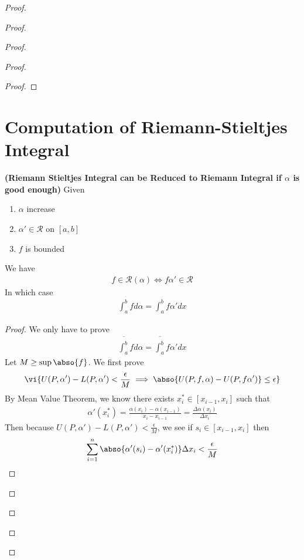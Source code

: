\documentclass{report}
\begin{document}
\begin{proof}
\begin{proof}
\begin{proof}
\begin{proof}
\begin{proof}
\end{proof}


\section{Computation of Riemann-Stieltjes Integral}
\begin{theorem}
\label{7.3.1}
\textbf{(Riemann Stieltjes Integral can be Reduced to Riemann Integral if $\alpha $ is good enough)} Given 
\begin{enumerate}[label=(\alph*)]
  \item $\alpha $ increase 
  \item $\alpha '\in \mathscr{R}$ on $[a,b]$ 
  \item $f$ is bounded
\end{enumerate}
We have 
\begin{align*}
 f\in \mathscr{R}(\alpha )\iff  f\alpha ' \in \mathscr{R}
\end{align*}
In which case 
\begin{align*}
\int_a^b fd\alpha =\int_a^b f \alpha ' dx
\end{align*}
\end{theorem}
\begin{proof}
We only have to prove 
\begin{align*}
\overline{\int_a^b} fd\alpha = \overline{\int_a^b}f\alpha ' dx 
\end{align*}
Let $M\geq \sup \abso{f}$. We first prove 
\begin{align*}
  \vi{U(P,\alpha ')-L(P,\alpha ')<\frac{\epsilon}{M}\implies \abso{U(P,f,\alpha )-U(P,f\alpha ')}\leq \epsilon }
\end{align*}
By Mean Value Theorem, we know there exists $x_i^* \in [x_{i-1},x_i]$ such that 
\begin{align*}
\alpha' (x_i^*)= \frac{\alpha (x_i)-\alpha (x_{i-1})}{x_i-x_{i-1}}=\frac{\Delta \alpha (x_i)}{\Delta x_i}
\end{align*}
Then because $U(P,\alpha ')-L(P,\alpha ')<\frac{\epsilon}{M}$, we see if $s_i \in [x_{i-1},x_i]$ then 
\begin{align*}
\sum_{i=1}^n \abso{\alpha '(s_i)-\alpha '(x_i^*)} \Delta x_i <\frac{\epsilon}{M}
\end{align*}

\end{proof}
\end{proof}
\end{proof}
\end{proof}
\end{proof}
\end{document}
